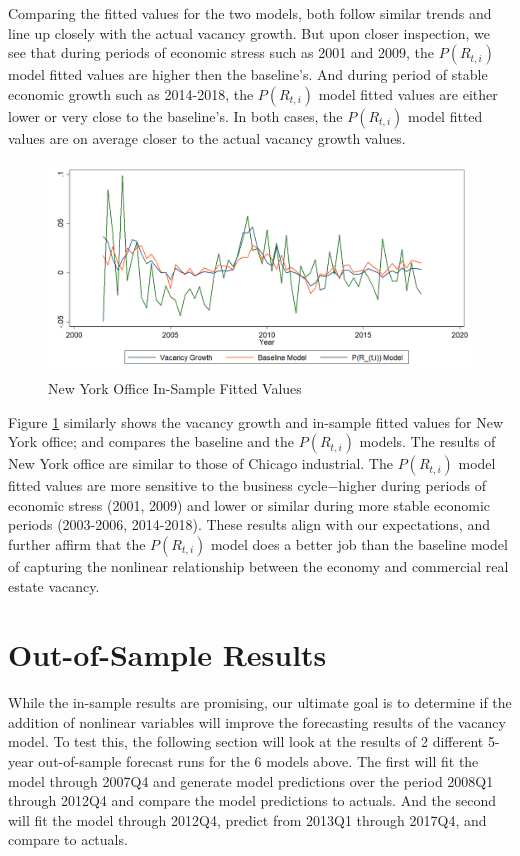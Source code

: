 \documentclass[10pt]{article}
\begin{document}
Comparing the fitted values for the two models, both follow similar trends and line up closely with the actual vacancy growth.  But upon closer inspection, we see that during periods of economic stress such as 2001 and 2009, the $P(R_{t,i})$ model fitted values are higher then the baseline's.  And during period of stable economic growth such as 2014-2018, the $P(R_{t,i})$ model fitted values are either lower or very close to the baseline's.  In both cases, the $P(R_{t,i})$ model fitted values are on average closer to the actual vacancy growth values.

\begin{figure}[h]
\begin{center}
\caption{New York Office In-Sample Fitted Values} \label{fig:newy-in}
\includegraphics[scale=0.22]{newyoff-insample-2.png}
\end{center}
\end{figure}

Figure \ref{fig:newy-in} similarly shows the vacancy growth and in-sample fitted values for New York office; and compares the baseline and the $P(R_{t,i})$ models.  The results of New York office are similar to those of Chicago industrial.  The $P(R_{t,i})$ model fitted values are more sensitive to the business cycle$-$higher during periods of economic stress (2001, 2009) and lower or similar during more stable economic periods (2003-2006, 2014-2018).  These results align with our expectations, and further affirm that the $P(R_{t,i})$ model does a better job than the baseline model of capturing the nonlinear relationship between the economy and commercial real estate vacancy.

\section*{Out-of-Sample Results}

While the in-sample results are promising, our ultimate goal is to determine if the addition of nonlinear variables will improve the forecasting results of the vacancy model.  To test this, the following section will look at the results of 2 different 5-year out-of-sample forecast runs for the 6 models above.  The first will fit the model through 2007Q4 and generate model predictions over the period 2008Q1 through 2012Q4 and compare the model predictions to actuals.  And the second will fit the model through 2012Q4, predict from 2013Q1 through 2017Q4, and compare to actuals.
\end{document}

